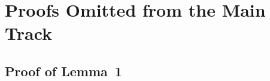 \documentclass[letterpaper]{article} %
\newcommand{\pair}[1]{(#1)}
\newcommand{\bmlambda}{\bm{\lambda}}
\begin{document}


\section{Proofs Omitted from the Main Track} %
\label{sec:technical_proofs}

\subsection{Proof of Lemma~1} %
\label{sub:proof_of_lemma_}
\end{document}
